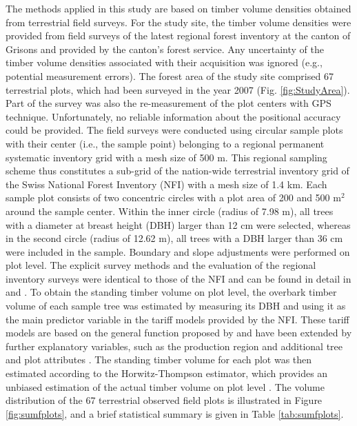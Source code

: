 The methods applied in this study are based on timber volume densities obtained from terrestrial field surveys. For the study site, the timber volume densities were provided from field surveys of the latest regional forest inventory at the canton of Grisons and provided by the canton's forest service. Any uncertainty of the timber volume densities associated with their acquisition was ignored (e.g., potential measurement errors). The forest area of the study site comprised 67 terrestrial plots, which had been surveyed in the year 2007 (Fig. \ref{fig:StudyArea}). Part of the survey was also the re-measurement of the plot centers with GPS technique. Unfortunately, no reliable information about the positional accuracy could be provided. The field surveys were conducted using circular sample plots with their center (i.e., the sample point) belonging to a regional permanent systematic inventory grid with a mesh size of 500 m. This regional sampling scheme thus constitutes a sub-grid of the nation-wide terrestrial inventory grid of the Swiss National Forest Inventory (NFI) with a mesh size of 1.4 km. Each sample plot consists of two concentric circles with a plot area of 200 and 500 m$^2$ around the sample center. Within the inner circle (radius of 7.98 m), all trees with a diameter at breast height (DBH) larger than 12 cm were selected, whereas in the second circle (radius of 12.62 m), all trees with a DBH larger than 36 cm were included in the sample. Boundary and slope adjustments were performed on plot level. The explicit survey methods and the evaluation of the regional inventory surveys were identical to those of the NFI and can be found in detail in \citet{brassel2001} and \citet{keller2011}. To obtain the standing timber volume on plot level, the overbark timber volume of each sample tree was estimated by measuring its DBH and using it as the main predictor variable in the tariff models provided by the NFI. These tariff models are based on the general function proposed by \citet{hoffmann1982} and have been extended by further explanatory variables, such as the production region and additional tree and plot attributes \citep{brassel2001}. The standing timber volume for each plot was then estimated according to the Horwitz-Thompson estimator, which provides an unbiased estimation of the actual timber volume on plot level \citep{mandallaz2008}. The volume distribution of the 67 terrestrial observed field plots is illustrated in Figure \ref{fig:sumfplots}, and a brief statistical summary is given in Table \ref{tab:sumfplots}.

